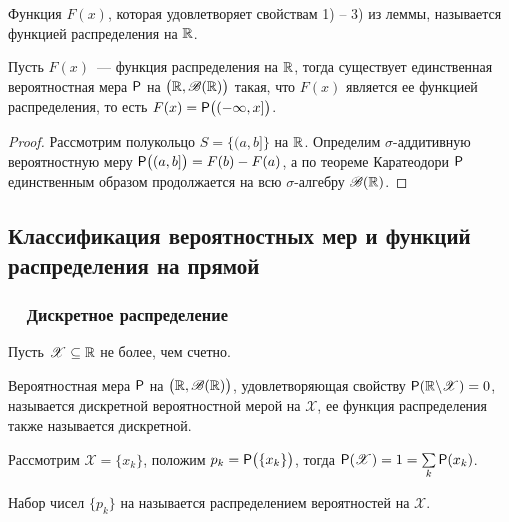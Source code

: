 \begin{definition}
	Функция $F(x)$, которая удовлетворяет свойствам 1) -- 3) из леммы, называется функцией распределения на $\R$.
\end{definition}
\begin{theorem}
	Пусть $F(x)$~--- функция распределения на $\R$, тогда существует единственная вероятностная мера $\P$ на $\big(\R, \B(\R) \big)$ такая, что $F(x)$ является ее функцией распределения, то есть $F(x) = \P \big( ( -\infty, x] \big)$.
	\begin{proof}
		Рассмотрим полукольцо $ S = \big\{ (a, b] \big\}$ на $\R$. Определим $\sigma$-аддитивную вероятностную меру $\P \big( (a, b] \big) = F(b) - F(a)$, а по теореме Каратеодори $\P$ единственным образом продолжается на всю $\sigma$-алгебру $\B(\R)$.
	\end{proof}
\end{theorem}
\subsection{Классификация вероятностных мер и функций распределения на прямой}
\subsubsection*{~~Дискретное распределение}
Пусть $\mathscr{X} \subseteq \R$ не более, чем счетно.
\begin{definition}
	Вероятностная мера $\P$ на $\big( \R, \B(\R) \big)$, удовлетворяющая свойству $\P(\R \backslash \mathscr{X}) = 0$, называется дискретной вероятностной мерой на $\mathscr{X}$, ее функция распределения также называется дискретной.
\end{definition}

Рассмотрим $\mathscr{X} = \{ x_k \}$, положим $p_k = \P \big( \{x_k \} \big)$, тогда $\P( \mathscr{X} ) = 1 = \sum\limits_{k} \P ( x_k )$.

\begin{definition}
	Набор чисел $\{ p_k \}$ на называется распределением вероятностей на $\mathscr{X}$.
\end{definition}


